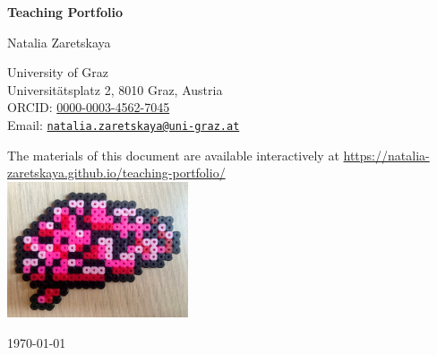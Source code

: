 \begin{titlepage}
\centering
\vspace*{3cm}
{\Huge\bfseries Teaching Portfolio\par}
\vspace{1.5cm}
{\Large Natalia Zaretskaya\par}
\vspace{0.5cm}
University of Graz\\
Universitätsplatz 2, 8010 Graz, Austria\\
ORCID: \href{https://orcid.org/0000-0003-4562-7045}{0000-0003-4562-7045}\\
Email: \href{mailto:natalia.zaretskaya@uni-graz.at}{\texttt{natalia.zaretskaya@uni-graz.at}}


The materials of this document are available interactively at
\href{https://natalia-zaretskaya.github.io/teaching-portfolio/}{https://natalia-zaretskaya.github.io/teaching-portfolio/}\\


\vfill
\includegraphics[width=0.4\textwidth]{images/brain_beeds.JPG}

\vfill
{\large \today\par}
\end{titlepage}
